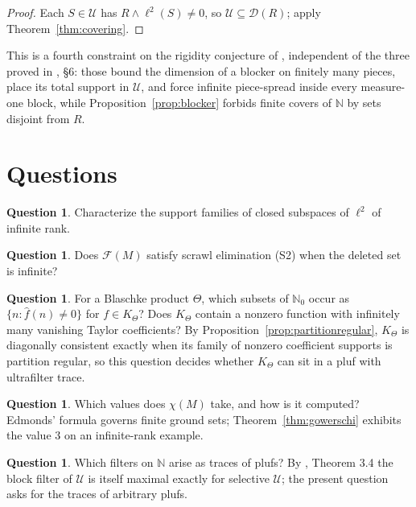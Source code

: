 \documentclass[11pt,reqno]{amsart}
\theoremstyle{definition}
\newtheorem{question}[theorem]{Question}
\newcommand{\N}{\mathbb{N}}
\newcommand{\F}{\mathcal{F}}
\newcommand{\cD}{\mathcal{D}}
\newcommand{\cU}{\mathcal{U}}
\begin{document}
\begin{proof}
Each $S\in\cU$ has $R\wedge\ell^2(S)\neq0$, so $\cU\subseteq\cD(R)$; apply
Theorem~\ref{thm:covering}.
\end{proof}

This is a fourth constraint on the rigidity conjecture of \cite{FWII},
independent of the three proved in \cite{FWIV}, \S6: those bound the dimension
of a blocker on finitely many pieces, place its total support in $\cU$, and
force infinite piece-spread inside every measure-one block, while
Proposition~\ref{prop:blocker} forbids finite covers of $\N$ by sets disjoint
from $R$.

\section{Questions}\label{sec:questions}

\begin{question}\label{q:mainopen}
Characterize the support families of closed subspaces of $\ell^2$ of infinite
rank.
\end{question}

\begin{question}\label{q:S2infinite}
Does $\F(M)$ satisfy scrawl elimination \textup{(S2)} when the deleted set is
infinite?
\end{question}

\begin{question}\label{q:coeff}
For a Blaschke product $\Theta$, which subsets of $\N_0$ occur as
$\{n:\hat f(n)\neq0\}$ for $f\in K_\Theta$? Does $K_\Theta$ contain a nonzero
function with infinitely many vanishing Taylor coefficients? By
Proposition~\ref{prop:partitionregular}, $K_\Theta$ is diagonally consistent
exactly when its family of nonzero coefficient supports is partition regular,
so this question decides whether $K_\Theta$ can sit in a pluf with ultrafilter
trace.
\end{question}

\begin{question}\label{q:spectrum}
Which values does $\chi(M)$ take, and how is it computed? Edmonds' formula
governs finite ground sets; Theorem~\ref{thm:gowerschi} exhibits the value $3$
on an infinite-rank example.
\end{question}

\begin{question}\label{q:traces}
Which filters on $\N$ arise as traces of plufs? By \cite{FWII}, Theorem 3.4 the
block filter of $\cU$ is itself maximal exactly for selective $\cU$; the
present question asks for the traces of arbitrary plufs.
\end{question}
\end{document}
